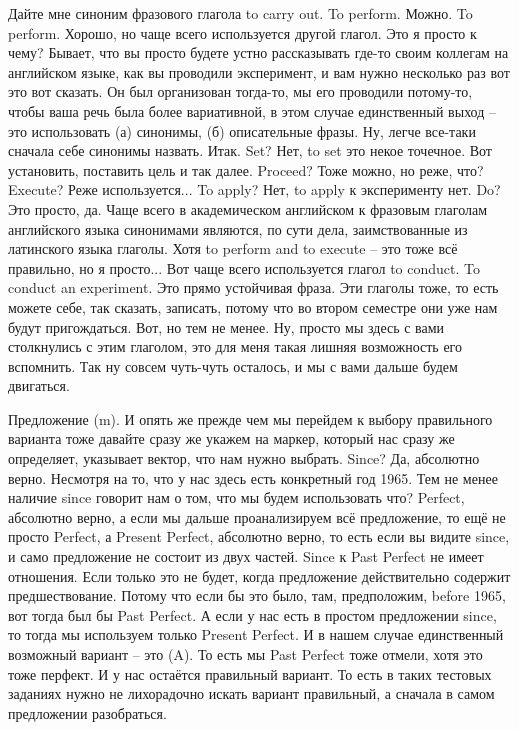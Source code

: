 \documentclass[main.tex]{subfiles}
\begin{document}
Дайте мне синоним фразового глагола to carry out.
To perform.
Можно.
To perform.
Хорошо, но чаще всего используется другой глагол.
Это я просто к чему?
Бывает, что вы просто будете устно рассказывать где-то своим коллегам на английском языке, как вы проводили эксперимент, и вам нужно несколько раз вот это вот сказать.
Он был организован тогда-то, мы его проводили потому-то, чтобы ваша речь была более вариативной, в этом случае единственный выход -- это использовать (а) синонимы, (б) описательные фразы.
Ну, легче все-таки сначала себе синонимы назвать.
Итак.
Set?
Нет, to set это некое точечное.
Вот установить, поставить цель и так далее.
Proceed?
Тоже можно, но реже, что?
Execute?
Реже используется...
To apply?
Нет, to apply к эксперименту нет.
Do?
Это просто, да.
Чаще всего в академическом английском к фразовым глаголам английского языка синонимами являются, по сути дела, заимствованные из латинского языка глаголы.
Хотя to perform and to execute -- это тоже всё правильно, но я просто...
Вот чаще всего используется глагол to conduct.
To conduct an experiment.
Это прямо устойчивая фраза.
Эти глаголы тоже, то есть можете себе, так сказать, записать, потому что во втором семестре они уже нам будут пригождаться.
Вот, но тем не менее.
Ну, просто мы здесь с вами столкнулись с этим глаголом, это для меня такая лишняя возможность его вспомнить.
Так ну совсем чуть-чуть осталось, и мы с вами дальше будем двигаться.

Предложение (m).
И опять же прежде чем мы перейдем к выбору правильного варианта тоже давайте сразу же укажем на маркер, который нас сразу же определяет, указывает вектор, что нам нужно выбрать.
Since?
Да, абсолютно верно.
Несмотря на то, что у нас здесь есть конкретный год 1965.
Тем не менее наличие since говорит нам о том, что мы будем использовать что?
Perfect, абсолютно верно, а если мы дальше проанализируем всё предложение, то ещё не просто Perfect, а Present Perfect, абсолютно верно, то есть если вы видите since, и само предложение не состоит из двух частей.
Since к Past Perfect не имеет отношения.
Если только это не будет, когда предложение действительно содержит предшествование.
Потому что если бы это было, там, предположим, before 1965, вот тогда был бы Past Perfect.
А если у нас есть в простом предложении since, то тогда мы используем только Present Perfect.
И в нашем случае единственный возможный вариант -- это (A).
То есть мы Past Perfect тоже отмели, хотя это тоже перфект.
И у нас остаётся правильный вариант.
То есть в таких тестовых заданиях нужно не лихорадочно искать вариант правильный, а сначала в самом предложении разобраться.
\end{document}

